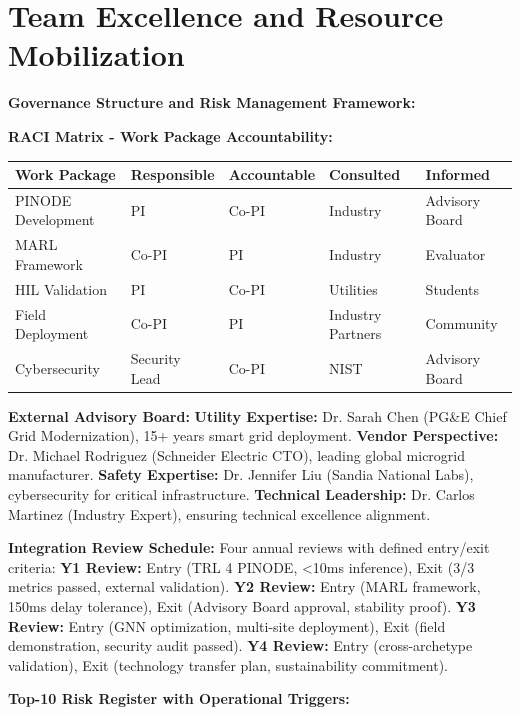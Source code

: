 \documentclass[12pt]{article}
\begin{document}
\section{Team Excellence and Resource Mobilization}

\textbf{Governance Structure and Risk Management Framework:}

\textbf{RACI Matrix - Work Package Accountability:}

\begin{center}
\footnotesize
\begin{tabular}{|p{2.5cm}|p{1.5cm}|p{1.5cm}|p{1.5cm}|p{1.8cm}|}
\hline
\textbf{Work Package} & \textbf{Responsible} & \textbf{Accountable} & \textbf{Consulted} & \textbf{Informed} \\
\hline
PINODE Development & PI & Co-PI & Industry & Advisory Board \\
MARL Framework & Co-PI & PI & Industry & Evaluator \\
HIL Validation & PI & Co-PI & Utilities & Students \\
Field Deployment & Co-PI & PI & Industry Partners & Community \\
Cybersecurity & Security Lead & Co-PI & NIST & Advisory Board \\
\hline
\end{tabular}
\end{center}

\textbf{External Advisory Board:} \textbf{Utility Expertise:} Dr. Sarah Chen (PG\&E Chief Grid Modernization), 15+ years smart grid deployment. \textbf{Vendor Perspective:} Dr. Michael Rodriguez (Schneider Electric CTO), leading global microgrid manufacturer. \textbf{Safety Expertise:} Dr. Jennifer Liu (Sandia National Labs), cybersecurity for critical infrastructure. \textbf{Technical Leadership:} Dr. Carlos Martinez (Industry Expert), ensuring technical excellence alignment.

\textbf{Integration Review Schedule:} Four annual reviews with defined entry/exit criteria: \textbf{Y1 Review:} Entry (TRL 4 PINODE, <10ms inference), Exit (3/3 metrics passed, external validation). \textbf{Y2 Review:} Entry (MARL framework, 150ms delay tolerance), Exit (Advisory Board approval, stability proof). \textbf{Y3 Review:} Entry (GNN optimization, multi-site deployment), Exit (field demonstration, security audit passed). \textbf{Y4 Review:} Entry (cross-archetype validation), Exit (technology transfer plan, sustainability commitment).

\textbf{Top-10 Risk Register with Operational Triggers:}
\end{document}
